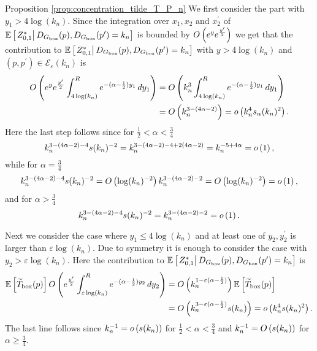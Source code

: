 \begin{proofof}{Proposition \ref{prop:concentration_tilde_T_P_n}}
We first consider the part with $y_1 > 4\log(k_n)$. Since the integration over $x_1, x_2$ and $x_2^\prime$ of $\mathbb{E}\left[\left.Z_{0,1}^\ast\right|D_{G_{\mathrm{box}}}(p), D_{G_{\mathrm{box}}}(p^\prime) = k_n\right]$ is bounded by $O\left(e^{y}e^{\frac{y^\prime}{2}}\right)$ we get that the contribution to $\mathbb{E}\left[\left.Z_{0,1}^\ast\right|D_{G_{\mathrm{box}}}(p), D_{G_{\mathrm{box}}}(p^\prime) = k_n\right]$ with $y > 4\log(k_n)$ and $(p,p^\prime) \in \mathcal{E}_\varepsilon(k_n)$ is
\begin{align*}
	O\left(e^{y}e^{\frac{y^\prime}{2}} \int_{4\log(k_n)}^{R} e^{-(\alpha - \frac{1}{2})y_1} \, dy_1\right)
	&= O\left(k_n^3 \int_{4\log(k_n)}^{R} e^{-(\alpha - \frac{1}{2})y_1} \, dy_1\right)\\
	&= O\left(k_n^{3 - (4\alpha - 2)}\right) = o\left(k_n^4 s_\alpha(k_n)^2\right).
\end{align*}
Here the last step follows since for $\frac{1}{2} < \alpha < \frac{3}{4}$
\[
	k_n^{3 - (4\alpha - 2) - 4} s(k_n)^{-2} 
	= k_n^{3 - (4\alpha - 2) - 4 + 2(4\alpha - 2)} = k_n^{-5 + 4\alpha} = o\left(1\right),
\]
while for $\alpha = \frac{3}{4}$
\[
	k_n^{3 - (4\alpha - 2) - 4} s(k_n)^{-2} 
	= O\left(\log(k_n)^{-2}\right) k_n^{3 - (4\alpha - 2) - 2} = O\left(\log(k_n)^{-2}\right) = o\left(1\right),
\]
and for $\alpha > \frac{3}{4}$
\[
	k_n^{3 - (4\alpha - 2) - 4} s(k_n)^{-2} = k_n^{3 - (4\alpha - 2) - 2} = o\left(1\right).
\]

Next we consider the case where $y_1 \le 4\log(k_n)$ and at least one of $y_2, y_2^\prime$ is larger than $\varepsilon \log(k_n)$. Due to symmetry it is enough to consider the case with $y_2 > \varepsilon \log(k_n)$. Here the contribution to $\mathbb{E}\left[\left.Z_{0,1}^\ast\right|D_{G_{\mathrm{box}}}(p), D_{G_{\mathrm{box}}}(p^\prime) = k_n\right]$ is
\begin{align*}
	\mathbb{E}\left[\widetilde{T}_{\text{box}}(p)\right]
		O\left(e^{\frac{y^\prime}{2}}\int_{\varepsilon \log(k_n)}^{R} e^{-(\alpha -\frac{1}{2})y_2} \, dy_2\right)
	&= O\left(k_n^{1 - \varepsilon(\alpha -\frac{1}{2})}\right)\mathbb{E}\left[\widetilde{T}_{\text{box}}(p)\right]\\
	&= O\left(k_n^{3 - \varepsilon(\alpha -\frac{1}{2})} s(k_n)\right) = o\left(k_n^4 s(k_n)^2\right).
\end{align*}
The last line follows since $k_n^{-1} = o\left(s(k_n)\right)$ for $\frac{1}{2} < \alpha < \frac{3}{4}$ and $k_n^{-1} = O\left(s(k_n)\right)$ for $\alpha \ge \frac{3}{4}$. 


\end{proofof}
